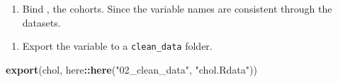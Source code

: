 \documentclass[]{book}
\newenvironment{Shaded}{\begin{snugshade}}{\end{snugshade}}
\newcommand{\KeywordTok}[1]{\textcolor[rgb]{0.13,0.29,0.53}{\textbf{#1}}}
\newcommand{\NormalTok}[1]{#1}
\newcommand{\OperatorTok}[1]{\textcolor[rgb]{0.81,0.36,0.00}{\textbf{#1}}}
\newcommand{\StringTok}[1]{\textcolor[rgb]{0.31,0.60,0.02}{#1}}
\providecommand{\tightlist}{%
  \setlength{\itemsep}{0pt}\setlength{\parskip}{0pt}}
\begin{document}
\begin{enumerate}
\def\labelenumi{\arabic{enumi}.}
\setcounter{enumi}{4}
\tightlist
\item
  Bind , the cohorts. Since the variable names are consistent through the datasets.
\end{enumerate}

\begin{Shaded}
\end{Shaded}

\begin{enumerate}
\def\labelenumi{\arabic{enumi}.}
\setcounter{enumi}{5}
\tightlist
\item
  Export the variable to a \texttt{clean\_data} folder.
\end{enumerate}

\begin{Shaded}
\begin{Highlighting}[]
\KeywordTok{export}\NormalTok{(chol, here}\OperatorTok{::}\KeywordTok{here}\NormalTok{(}\StringTok{"02_clean_data"}\NormalTok{, }\StringTok{"chol.Rdata"}\NormalTok{))}
\end{Highlighting}
\end{Shaded}
\end{document}
